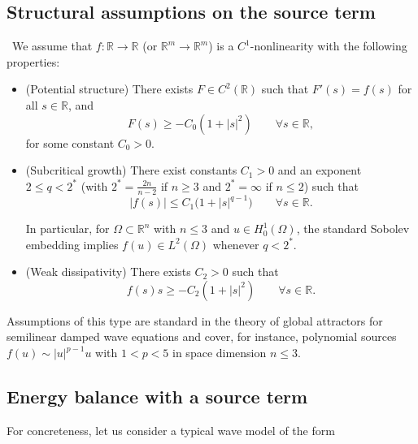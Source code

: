 \documentclass[11pt,reqno]{amsart}
\theoremstyle{remark}
\begin{document}
\subsection{Structural assumptions on the source term}~We assume that $f:\mathbb{R}\to\mathbb{R}$ (or $\mathbb{R}^m\to\mathbb{R}^m$) is a $C^1$-nonlinearity with the following properties:

\begin{itemize}\item[(F1)] (Potential structure) There exists $F\in C^2(\mathbb{R})$ such that $F'(s)=f(s)$ for all $s\in\mathbb{R}$, and$$F(s)\ge -C_0(1+|s|^2)\qquad\forall s\in\mathbb{R},$$  for some constant $C_0>0$.

\item[(F2)] (Subcritical growth) There exist constants $C_1>0$ and an exponent $2\le q<2^*$ (with $2^*=\frac{2n}{n-2}$ if $n\ge3$ and $2^*=\infty$ if $n\le2$) such that
    \begin{equation}\label{eq:f_growth}
    |f(s)| \le C_1\bigl(1+|s|^{q-1}\bigr)\qquad\forall s\in\mathbb{R}.
    \end{equation}

    In particular, for $\Omega\subset\mathbb{R}^n$ with $n\le3$ and $u\in H_0^1(\Omega)$, the standard Sobolev embedding implies $f(u)\in L^2(\Omega)$ whenever $q<2^*$.\item[(F3)] (Weak dissipativity) There exists $C_2>0$ such that
    $$f(s)s \ge -C_2(1+|s|^2)\qquad\forall s\in\mathbb{R}.$$
    \end{itemize}

    Assumptions of this type are standard in the theory of global attractors for semilinear damped wave equations and cover, for instance, polynomial sources $f(u)\sim |u|^{p-1}u$ with $1<p<5$ in space dimension $n\le3$.

    \subsection{Energy balance with a source term}

    For concreteness, let us consider a typical wave model of the form
\end{document}
